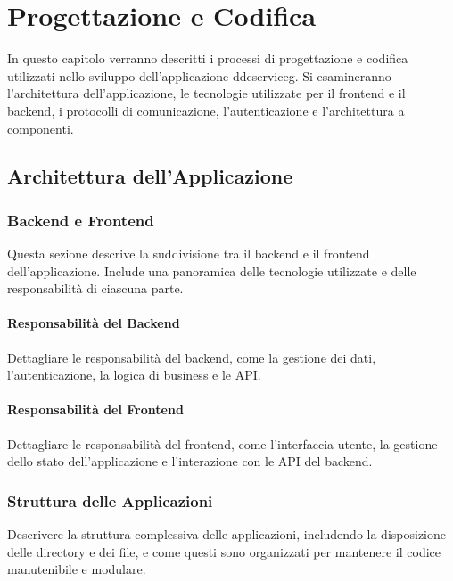 \chapter{Progettazione e Codifica}
\label{chap:design_coding}

In questo capitolo verranno descritti i processi di progettazione e codifica utilizzati nello sviluppo dell'applicazione \gls{ddcserviceg}\glox. Si esamineranno l'architettura dell'applicazione, le tecnologie utilizzate per il frontend e il backend, i protocolli di comunicazione, l'autenticazione e l'architettura a componenti.

\section{Architettura dell'Applicazione}
\label{sec:architettura_applicazione}

\subsection{Backend e Frontend}
\label{subsec:backend_frontend}

Questa sezione descrive la suddivisione tra il backend e il frontend dell'applicazione. Include una panoramica delle tecnologie utilizzate e delle responsabilità di ciascuna parte.

\subsubsection*{Responsabilità del Backend}
Dettagliare le responsabilità del backend, come la gestione dei dati, l'autenticazione, la logica di business e le API.

\subsubsection*{Responsabilità del Frontend}
Dettagliare le responsabilità del frontend, come l'interfaccia utente, la gestione dello stato dell'applicazione e l'interazione con le API del backend.

\subsection{Struttura delle Applicazioni}
\label{subsec:struttura_applicazioni}

Descrivere la struttura complessiva delle applicazioni, includendo la disposizione delle directory e dei file, e come questi sono organizzati per mantenere il codice manutenibile e modulare.


